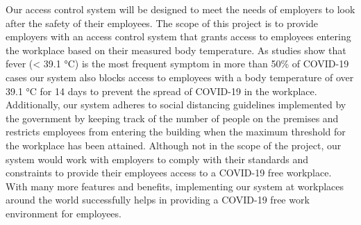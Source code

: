 Our access control system will be designed to meet the needs of employers to
look after the safety of their employees. The scope of this project is to
provide employers with an access control system that grants access to employees
entering the workplace based on their measured body temperature. As studies show
that fever (< 39.1 °C) is the most frequent symptom in more than 50\% of
COVID-19 cases our system also blocks access to employees with a body
temperature of over 39.1 °C for 14 days to prevent the spread of COVID-19 in the
workplace. Additionally, our system adheres to social distancing guidelines
implemented by the government by keeping track of the number of people on the
premises and restricts employees from entering the building when the maximum
threshold for the workplace has been attained. Although not in the scope of the
project, our system would work with employers to comply with their standards and
constraints to provide their employees access to a COVID-19 free workplace. With
many more features and benefits, implementing our system at workplaces around
the world successfully helps in providing a COVID-19 free work environment for
employees.

